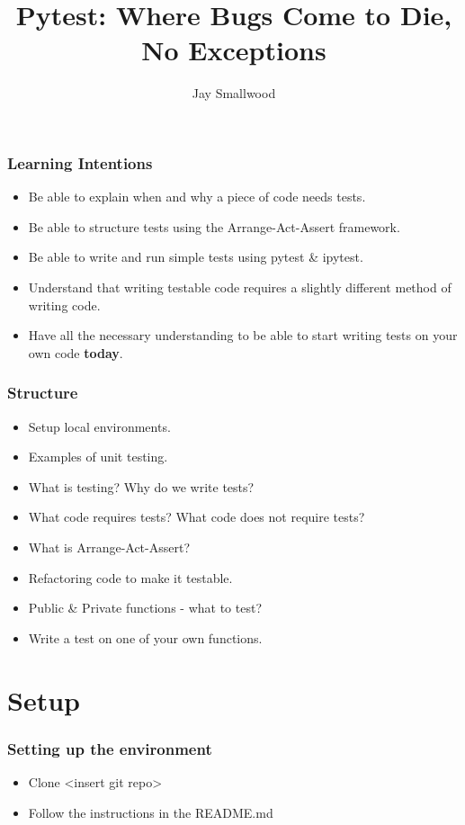 \documentclass{beamer}
\title{Pytest: Where Bugs Come to Die, No Exceptions}
\author{Jay Smallwood}
\begin{document}
\begin{frame}[plain]
    \maketitle
\end{frame}
\begin{frame}
	\frametitle{Learning Intentions}
	\begin{itemize}
		\item Be able to explain when and why a piece of code needs tests.
		\item  Be able to structure tests using the Arrange-Act-Assert framework.
		\item  Be able to write and run simple tests using pytest \& ipytest.
		\item  Understand that writing testable code requires a slightly different method of writing code.
		\item Have all the necessary understanding to be able to start writing tests on your own code \textbf{today}.
	\end{itemize}
\end{frame}

\begin{frame}
	\frametitle{Structure}
	\begin{itemize}
		\item Setup local environments.
		\item  Examples of unit testing.
		\item  What is testing? Why do we write tests?
		\item  What code requires tests? What code does not require tests?
		\item What is Arrange-Act-Assert? 
		\item Refactoring code to make it testable.
		\item Public \& Private functions - what to test?
		\item Write a test on one of your own functions.
	\end{itemize}
	
\end{frame}

\section{Setup}
\begin{frame}
	\frametitle{Setting up the environment}
	\begin{itemize}
		\item Clone <insert git repo>
		\item Follow the instructions in the README.md
	\end{itemize}
	
\end{frame}
\end{document}
